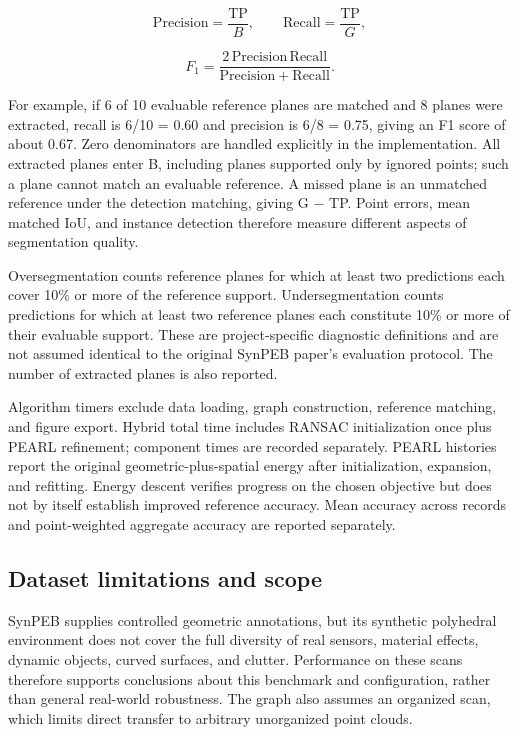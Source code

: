 \begin{equation}
\mathrm{Precision}=\frac{\mathrm{TP}}B,\qquad\mathrm{Recall}=\frac{\mathrm{TP}}G,
\label{eq:62}
\end{equation}

\begin{equation}
F_1=\frac{2\,\mathrm{Precision}\,\mathrm{Recall}}{\mathrm{Precision}+\mathrm{Recall}}.
\label{eq:63}
\end{equation}

For example, if 6 of 10 evaluable reference planes are matched and 8 planes were extracted, recall is 6/10 = 0.60 and precision is 6/8 = 0.75, giving an F1 score of about 0.67. Zero denominators are handled explicitly in the implementation. All extracted planes enter B, including planes supported only by ignored points; such a plane cannot match an evaluable reference. A missed plane is an unmatched reference under the detection matching, giving G \(-\) TP. Point errors, mean matched IoU, and instance detection therefore measure different aspects of segmentation quality.

Oversegmentation counts reference planes for which at least two predictions each cover 10\% or more of the reference support. Undersegmentation counts predictions for which at least two reference planes each constitute 10\% or more of their evaluable support. These are project-specific diagnostic definitions and are not assumed identical to the original SynPEB paper's evaluation protocol. The number of extracted planes is also reported.

Algorithm timers exclude data loading, graph construction, reference matching, and figure export. Hybrid total time includes RANSAC initialization once plus PEARL refinement; component times are recorded separately. PEARL histories report the original geometric-plus-spatial energy after initialization, expansion, and refitting. Energy descent verifies progress on the chosen objective but does not by itself establish improved reference accuracy. Mean accuracy across records and point-weighted aggregate accuracy are reported separately.

\subsection{Dataset limitations and scope}\label{dataset-limitations-and-scope}

SynPEB supplies controlled geometric annotations, but its synthetic polyhedral environment does not cover the full diversity of real sensors, material effects, dynamic objects, curved surfaces, and clutter. Performance on these scans therefore supports conclusions about this benchmark and configuration, rather than general real-world robustness. The graph also assumes an organized scan, which limits direct transfer to arbitrary unorganized point clouds.


